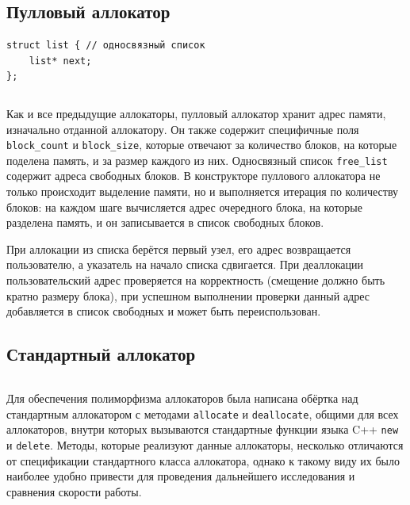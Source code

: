 \subsection*{Пулловый аллокатор}
\small
\begin{verbatim}
struct list { // односвязный список 
	list* next;
};
\end{verbatim}
\inputminted{cpp}{src/pool_allocator.h}
\normalsize

Как и все предыдущие аллокаторы, пулловый аллокатор хранит адрес памяти, изначально отданной аллокатору. Он также содержит специфичные поля \texttt{block\_count} и \texttt{block\_size}, которые отвечают за количество блоков, на которые поделена память, и за размер каждого из них. Односвязный список \texttt{free\_list} содержит адреса свободных блоков. В конструкторе пуллового аллокатора не только происходит выделение памяти, но и выполняется итерация по количеству блоков: на каждом шаге вычисляется адрес очередного блока, на которые разделена память, и он записывается в список свободных блоков.

При аллокации из списка берётся первый узел, его адрес возвращается пользователю, а указатель на начало списка сдвигается. При деаллокации пользовательский адрес проверяется на корректность (смещение должно быть кратно размеру блока), при успешном выполнении проверки данный адрес добавляется в список свободных и может быть переиспользован.

\subsection*{Стандартный аллокатор}
\small
\inputminted{cpp}{src/standard_allocator.h}
\normalsize

Для обеспечения полиморфизма аллокаторов была написана обёртка над стандартным аллокатором с методами \texttt{allocate} и \texttt{deallocate}, общими для всех аллокаторов, внутри которых вызываются стандартные функции языка C++ \texttt{new} и \texttt{delete}. Методы, которые реализуют данные аллокаторы, несколько отличаются от спецификации стандартного класса аллокатора, однако к такому виду их было наиболее удобно привести для проведения дальнейшего исследования и сравнения скорости работы.
